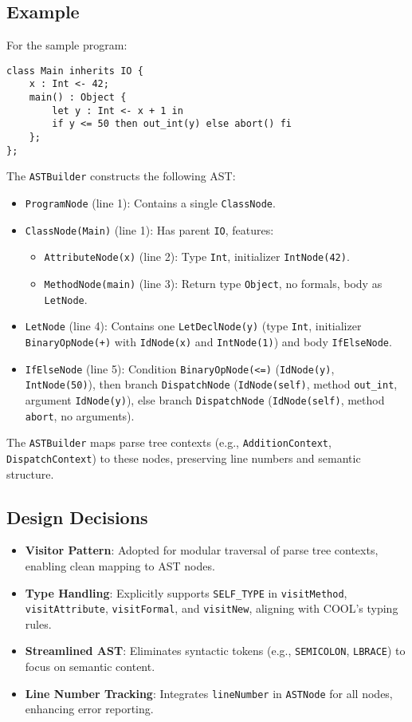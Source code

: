 \documentclass[11pt, titlepage]{article}
\begin{document}
\subsection{Example}
For the sample program:
\begin{lstlisting}
class Main inherits IO {
    x : Int <- 42;
    main() : Object {
        let y : Int <- x + 1 in
        if y <= 50 then out_int(y) else abort() fi
    };
};
\end{lstlisting}
The \texttt{ASTBuilder} constructs the following AST:
\begin{itemize}[leftmargin=*]
    \item \texttt{ProgramNode} (line 1): Contains a single \texttt{ClassNode}.
    \item \texttt{ClassNode(Main)} (line 1): Has parent \texttt{IO}, features:
        \begin{itemize}
            \item \texttt{AttributeNode(x)} (line 2): Type \texttt{Int}, initializer \texttt{IntNode(42)}.
            \item \texttt{MethodNode(main)} (line 3): Return type \texttt{Object}, no formals, body as \texttt{LetNode}.
        \end{itemize}
    \item \texttt{LetNode} (line 4): Contains one \texttt{LetDeclNode(y)} (type \texttt{Int}, initializer \texttt{BinaryOpNode(+)} with \texttt{IdNode(x)} and \texttt{IntNode(1)}) and body \texttt{IfElseNode}.
    \item \texttt{IfElseNode} (line 5): Condition \texttt{BinaryOpNode(<=)} (\texttt{IdNode(y)}, \texttt{IntNode(50)}), then branch \texttt{DispatchNode} (\texttt{IdNode(self)}, method \texttt{out\_int}, argument \texttt{IdNode(y)}), else branch \texttt{DispatchNode} (\texttt{IdNode(self)}, method \texttt{abort}, no arguments).
\end{itemize}
The \texttt{ASTBuilder} maps parse tree contexts (e.g., \texttt{AdditionContext}, \texttt{DispatchContext}) to these nodes, preserving line numbers and semantic structure.

\subsection{Design Decisions}
\begin{itemize}[leftmargin=*]
    \item \textbf{Visitor Pattern}: Adopted for modular traversal of parse tree contexts, enabling clean mapping to AST nodes.
    \item \textbf{Type Handling}: Explicitly supports \texttt{SELF\_TYPE} in \texttt{visitMethod}, \texttt{visitAttribute}, \texttt{visitFormal}, and \texttt{visitNew}, aligning with COOL's typing rules.
    \item \textbf{Streamlined AST}: Eliminates syntactic tokens (e.g., \texttt{SEMICOLON}, \texttt{LBRACE}) to focus on semantic content.
    \item \textbf{Line Number Tracking}: Integrates \texttt{lineNumber} in \texttt{ASTNode} for all nodes, enhancing error reporting.
\end{itemize}
\end{document}

